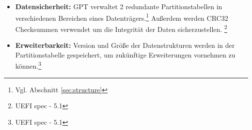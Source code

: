\begin{itemize}
    Für heutige Datenträger sind oft weder 2TiB noch 4TiB ausreichend.
    GPT verwendet stattdessen 64 Bit große Datenstrukturen um Anfang und Ende einer Partition zu speichern,\footnote{Vgl. Abschnitt \ref{sec:structure:header}} wodurch sich bei 512 Byte großen Blöcken eine maximale Größe von $ 2^{64} \cdot 512 \mathrm{B} = 8 \mathrm{ZiB} $ ergibt.

    \small
    \textit{
    TODO: Evtl. hier noch sagen, dass diese Limits voraussichtlich für die Zukunft ausreichend sind.
    Da müsste ich mir noch überlegen auf welcher Datengrundlage ich das Begründe.
    Ne Idee wäre diese Grafik zu verwenden: \url{https://upload.wikimedia.org/wikipedia/commons/9/90/Hard_drive_capacity_over_time.svg}
    Ist aber ne logarithmische Skala, das hochzurechnen wann das 144 PB erreicht wird frickelig.
    }

    \item \textbf{Datensicherheit:} GPT verwaltet 2 redundante Partitionstabellen in verschiedenen Bereichen eines Datenträgers.\footnote{Vgl. Abschnitt \ref{sec:structure}}
    Außerdem werden CRC32 Checksummen verwendet um die Integrität der Daten sicherzustellen. \footnote{UEFI spec - 5.1}

    \item \textbf{Erweiterbarkeit:} Version und Größe der Datenstrukturen werden in der Partitionstabelle gespeichert, um zukünftige Erweiterungen vornehmen zu können.\footnote{UEFI spec - 5.1}
\end{itemize}
